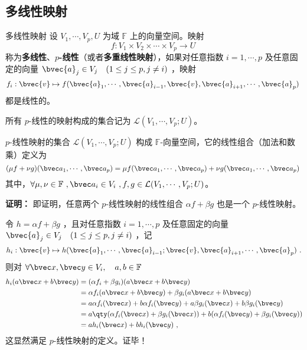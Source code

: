 
\begin{issues}
\issueTODO
\end{issues}



\subsection{多线性映射}
\begin{definition}{多线性映射}
设 $V_1,\cdots,V_p, U$ 为域 $\mathbb{F}$ 上的向量空间。映射
\begin{equation}
f:V_1\times V_2\times\cdots\times V_p\rightarrow U~
\end{equation}
称为\textbf{多线性}、\textbf{$p$-线性}（或者\textbf{多重线性映射}），如果对任意指数 $i=1,\cdots,p$ 及任意固定的向量 $\bvec{a}_j \in V_j\quad(1 \leq j \leq p,j\neq i)$ ，映射
\begin{equation}
f_i:\bvec{v}\mapsto f(\bvec{a}_1, \cdots, \bvec{a}_{i-1}, \bvec{v},\bvec{a}_{i+1}, \cdots,\bvec{a}_p)~
\end{equation}
都是线性的。
\end{definition}
所有 $p$-线性的映射构成的集合记为 $\mathcal{L}(V_1,\cdots,V_p;U)$。

\begin{theorem}{}
$p$-线性映射的集合 $\mathcal{L}(V_1,\cdots,V_p;U)$ 构成 $\mathbb{F}$-向量空间，它的线性组合（加法和数乘）定义为
\begin{equation}
(\mu f+\nu g)(\bvec a_1,\cdots,\bvec a_p)=\mu f(\bvec a_1,\cdots,\bvec a_p)+\nu g(\bvec a_1,\cdots,\bvec a_p)~
\end{equation}
其中，$\forall \mu,\nu \in\mathbb{F}~, \bvec a_i \in V_i~, f, g\in \mathcal{L}(V_1,\cdots,V_p;U)$。
\end{theorem}
\textbf{证明：} 即证明，任意两个 $p$-线性映射的线性组合 $\alpha f+\beta g$ 也是一个 $p$-线性映射。

令 $h=\alpha f+\beta g$ ，且对任意指数 $i=1,\cdots,p$ 及任意固定的向量 $\bvec{a}_j \in V_j\quad(1\leq j\leq p,j\neq i)$ ，记
\begin{equation}
h_i:\bvec{v}\mapsto h(\bvec{a}_1,\cdots,\bvec{a}_{i-1};\bvec{v},\bvec{a}_{i+1},\cdots,\bvec{a}_p)~.
\end{equation}
则对 $\forall \bvec x,\bvec y\in V_i,\quad a,b\in\mathbb{F}$
\begin{equation}
\begin{aligned}
h_i(a \bvec x+b\bvec y)&=(\alpha f_i+\beta g_i)(a \bvec x+b\bvec y)\\
&=\alpha f_i(a \bvec x+b\bvec y)+\beta g_i(a \bvec x+b\bvec y)\\
&=a\alpha f_i(\bvec x)+b\alpha f_i(\bvec y)+a\beta g_i(\bvec x)+b\beta g_i(\bvec y)\\
&=a\qty(\alpha f_i(\bvec x)+\beta g_i(\bvec x))+b(\alpha f_i(\bvec y)+\beta g_i(\bvec y))\\
&=ah_i(\bvec x)+bh_i(\bvec y)~,
\end{aligned}
\end{equation}
这显然满足 $p$-线性映射的定义。证毕！

